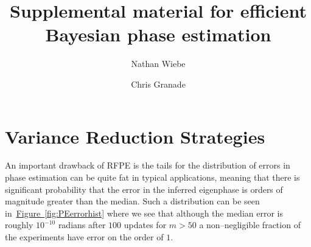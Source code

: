 \documentclass[aps,pra,amsmath,twocolumn,amssymb,superscriptaddress]{revtex4-1}
\newcommand{\fig}[1]{\hyperref[fig:#1]{Figure~\ref*{fig:#1}}}
\begin{document}

\title{Supplemental material for efficient Bayesian phase estimation}
\author{Nathan Wiebe}

\author{Chris Granade}


\maketitle



\onecolumngrid

\section{Variance Reduction Strategies}
\label{app:var-reduction}

An important drawback of RFPE is  the tails for the distribution of errors in phase estimation can be quite fat in typical applications, meaning that there is significant probability that the error in the inferred eigenphase is orders of magnitude greater than the median.  Such a distribution can be seen in~\fig{PEerrorhist} where we see that although the median error is roughly $10^{-10}$ radians after $100$ updates for $m>50$  a non--negligible fraction of the experiments have error on the order of $1$.    
\end{document}
